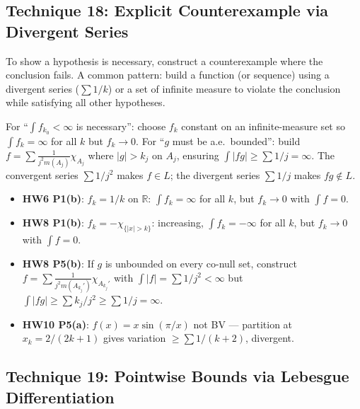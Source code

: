 \documentclass[11pt]{report}
\begin{document}
\subsection{Technique 18: Explicit Counterexample via Divergent Series}

To show a hypothesis is necessary, construct a counterexample where the conclusion fails. A common pattern: build a function (or sequence) using a divergent series ($\sum 1/k$) or a set of infinite measure to violate the conclusion while satisfying all other hypotheses.

\begin{rembox}[Strategy]
For ``$\int f_{k_0} < \infty$ is necessary'': choose $f_k$ constant on an infinite-measure set so $\int f_k = \infty$ for all $k$ but $f_k \to 0$. For ``$g$ must be a.e.\ bounded'': build $f = \sum \frac{1}{j^2 m(A_j)} \chi_{A_j}$ where $|g| > k_j$ on $A_j$, ensuring $\int |fg| \geq \sum 1/j = \infty$. The convergent series $\sum 1/j^2$ makes $f \in L$; the divergent series $\sum 1/j$ makes $fg \notin L$.
\end{rembox}

\begin{exbox}
\begin{itemize}
\item \textbf{HW6 P1(b)}: $f_k = 1/k$ on $\mathbb{R}$: $\int f_k = \infty$ for all $k$, but $f_k \to 0$ with $\int f = 0$.
\item \textbf{HW8 P1(b)}: $f_k = -\chi_{\{|x|>k\}}$: increasing, $\int f_k = -\infty$ for all $k$, but $f_k \to 0$ with $\int f = 0$.
\item \textbf{HW8 P5(b)}: If $g$ is unbounded on every co-null set, construct $f = \sum \frac{1}{j^2 m(A_{k_j}')} \chi_{A_{k_j}'}$ with $\int |f| = \sum 1/j^2 < \infty$ but $\int |fg| \geq \sum k_j/j^2 \geq \sum 1/j = \infty$.
\item \textbf{HW10 P5(a)}: $f(x) = x\sin(\pi/x)$ not BV --- partition at $x_k = 2/(2k+1)$ gives variation $\geq \sum 1/(k+2)$, divergent.
\end{itemize}
\end{exbox}

\subsection{Technique 19: Pointwise Bounds via Lebesgue Differentiation}
\end{document}
